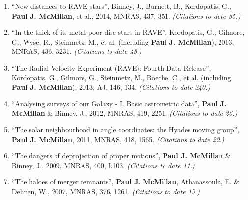 \documentclass{resume}
\begin{document}
\begin{enumerate}
\item ``New distances to RAVE stars'', Binney, J., Burnett, B., Kordopatis, G., \textbf{Paul J. McMillan}, et al., 2014, MNRAS, 437, 351. \textit{(Citations to date 85.)}

\item ``In the thick of it: metal-poor disc stars in RAVE'', Kordopatis, G., Gilmore, G., Wyse, R., Steinmetz, M., et al. (including \textbf{Paul J. McMillan}), 2013, MNRAS, 436, 3231. \textit{(Citations to date 48.)}

\item ``The Radial Velocity Experiment (RAVE): Fourth Data Release'', Kordopatis, G., Gilmore, G., Steinmetz, M., Boeche, C., et al. (including \textbf{Paul J. McMillan}), 2013, AJ, 146, 134. \textit{(Citations to date 240.)}

\item ``Analysing surveys of our Galaxy - I. Basic astrometric data'', \textbf{Paul J. McMillan} \& Binney, J., 2012, MNRAS, 419, 2251. \textit{(Citations to date 26.)}

\item ``The solar neighbourhood in angle coordinates: the Hyades moving group'', \textbf{Paul J. McMillan}, 2011, MNRAS, 418, 1565. \textit{(Citations to date 22.)}

\item ``The dangers of deprojection of proper motions'', \textbf{Paul J. McMillan} \& Binney, J., 2009, MNRAS, 400, L103. \textit{(Citations to date 11.)}

\item ``The haloes of merger remnants'', \textbf{Paul J. McMillan}, Athanassoula, E. \& Dehnen, W., 2007, MNRAS, 376, 1261. \textit{(Citations to date 15.)}

\end{enumerate}
\end{document}
